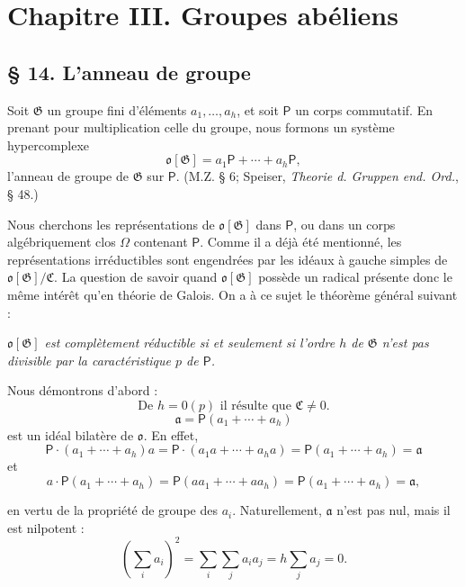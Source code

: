 
\section*{Chapitre III. Groupes abéliens}\label{fr-r823-chapitre-iii-groupes-abeliens}

\subsection*{\S{} 14. L'anneau de groupe}\label{fr-r823-anneau-de-groupe}

Soit \(\mathfrak G\) un groupe fini d'éléments \(a_1,\ldots,a_h\), et soit \(\mathsf P\) un corps commutatif. En prenant pour multiplication celle du groupe, nous formons un système hypercomplexe
\[
\mathfrak o[\mathfrak G]=a_1\mathsf P+\cdots+a_h\mathsf P,
\]
l'anneau de groupe de \(\mathfrak G\) sur \(\mathsf P\). (M.Z. \S{} 6; Speiser, \emph{Theorie d. Gruppen end. Ord.}, \S{} 48.)

Nous cherchons les représentations de \(\mathfrak o[\mathfrak G]\) dans \(\mathsf P\), ou dans un corps algébriquement clos \(\Omega\) contenant \(\mathsf P\). Comme il a déjà été mentionné, les représentations irréductibles sont engendrées par les idéaux à gauche simples de \(\mathfrak o[\mathfrak G]/\mathfrak C\). La question de savoir quand \(\mathfrak o[\mathfrak G]\) possède un radical présente donc le même intérêt qu'en théorie de Galois. On a à ce sujet le théorème général suivant :

\begin{center}
\emph{\(\mathfrak o[\mathfrak G]\) est complètement réductible si et seulement si l'ordre \(h\) de \(\mathfrak G\) n'est pas divisible par la caractéristique \(p\) de \(\mathsf P\).}
\end{center}

Nous démontrons d'abord :
\[
\text{De } h=0(p) \text{ il résulte que } \mathfrak C\ne 0.
\]
\[
\mathfrak a=\mathsf P(a_1+\cdots+a_h)
\]
est un idéal bilatère de \(\mathfrak o\). En effet,
\[
\mathsf P\cdot(a_1+\cdots+a_h)a
=\mathsf P\cdot(a_1a+\cdots+a_ha)
=\mathsf P(a_1+\cdots+a_h)=\mathfrak a
\]
et
\[
a\cdot\mathsf P(a_1+\cdots+a_h)
=\mathsf P(aa_1+\cdots+aa_h)
=\mathsf P(a_1+\cdots+a_h)=\mathfrak a,
\]

en vertu de la propriété de groupe des \(a_i\). Naturellement, \(\mathfrak a\) n'est pas nul, mais il est nilpotent :
\[
\left(\sum_i a_i\right)^2=\sum_i\sum_j a_i a_j
=h\sum_j a_j=0.
\]

